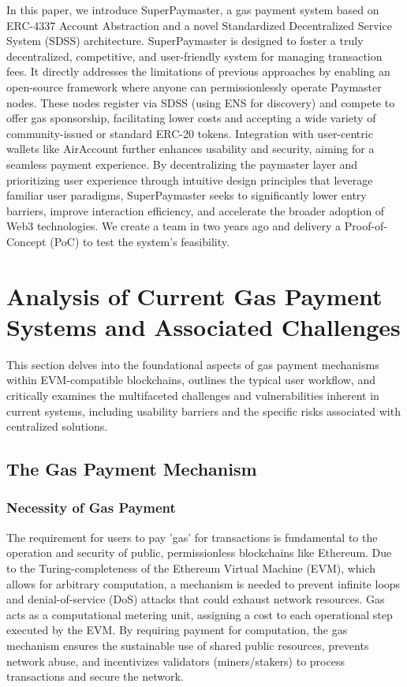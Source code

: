 \documentclass[preprint,12pt]{elsarticle}
\begin{document}
In this paper, we introduce SuperPaymaster, a gas payment system based on ERC-4337 Account Abstraction and a novel Standardized Decentralized Service System (SDSS) architecture. SuperPaymaster is designed to foster a truly decentralized, competitive, and user-friendly system for managing transaction fees. It directly addresses the limitations of previous approaches by enabling an open-source framework where anyone can permissionlessly operate Paymaster nodes. These nodes register via SDSS (using ENS for discovery) and compete to offer gas sponsorship, facilitating lower costs and accepting a wide variety of community-issued or standard ERC-20 tokens. Integration with user-centric wallets like AirAccount further enhances usability and security, aiming for a seamless payment experience. By decentralizing the paymaster layer and prioritizing user experience through intuitive design principles that leverage familiar user paradigms, SuperPaymaster seeks to significantly lower entry barriers, improve interaction efficiency, and accelerate the broader adoption of Web3 technologies. We create a team in two years ago and delivery a Proof-of-Concept (PoC) to test the system's feasibility.

\section{Analysis of Current Gas Payment Systems and Associated Challenges}
\label{sec:analysis}

This section delves into the foundational aspects of gas payment mechanisms within EVM-compatible blockchains, outlines the typical user workflow, and critically examines the multifaceted challenges and vulnerabilities inherent in current systems, including usability barriers and the specific risks associated with centralized solutions.

\subsection{The Gas Payment Mechanism}
\label{subsec:gas-mechanism}

\subsubsection{Necessity of Gas Payment}

The requirement for users to pay 'gas' for transactions is fundamental to the operation and security of public, permissionless blockchains like Ethereum. Due to the Turing-completeness of the Ethereum Virtual Machine (EVM)\cite{wood2014}, which allows for arbitrary computation, a mechanism is needed to prevent infinite loops and denial-of-service (DoS) attacks that could exhaust network resources\cite{wood2014}. Gas acts as a computational metering unit, assigning a cost to each operational step executed by the EVM. By requiring payment for computation, the gas mechanism ensures the sustainable use of shared public resources, prevents network abuse, and incentivizes validators (miners/stakers) to process transactions and secure the network\cite{buterin2013}.
\end{document}
